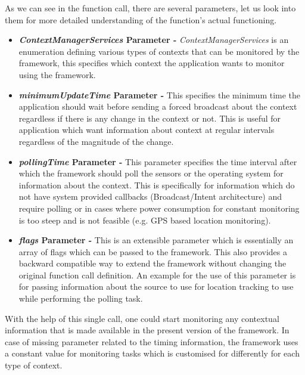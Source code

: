 \documentclass[12pt]{report}
\begin{document}
As we can see in the function call, there are several parameters, let us look into them for more detailed understanding of the function's actual functioning.

\begin{itemize}
\item \textbf{\textit{ContextManagerServices} Parameter - } \textit{ContextManagerServices} is an enumeration defining various types of contexts that can be monitored by the framework, this specifies which context the application wants to monitor using the framework.

\item \textbf{\textit{minimumUpdateTime} Parameter - } This specifies the minimum time the application should wait before sending a forced broadcast about the context regardless if there is any change in the context or not. This is useful for application which want information about context at regular intervals regardless of the magnitude of the change.

\item \textbf{\textit{pollingTime} Parameter - } This parameter specifies the time interval after which the framework should poll the sensors or the operating system for information about the context. This is specifically for information which do not have system provided callbacks (Broadcast/Intent architecture) and require polling or in cases where power consumption for constant monitoring is too steep and is not feasible (e.g. GPS based location monitoring).

\item \textbf{\textit{flags} Parameter - } This is an extensible parameter which is essentially an array of flags which can be passed to the framework. This also provides a backward compatible way to extend the framework without changing the original function call definition. An example for the use of this parameter is for passing information about the source to use for location tracking to use while performing the polling task.

\end{itemize}

With the help of this single call, one could start monitoring any contextual information that is made available in the present version of the framework. In case of missing parameter related to the timing information, the framework uses a constant value for monitoring tasks which is customised for differently for each type of context.
\end{document}
